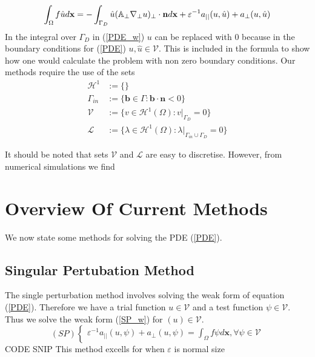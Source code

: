 \documentclass[12pt]{ociamthesis}
\begin{document}
\begin{equation} \label{PDE_w}
\int_{\Omega}f\hat{u}d\mathbf{x} = -\int_{\Gamma_D}\hat{u}(\mathbb{A}_{\perp}\nabla_{\perp} u)_{\perp}\cdot \mathbf{n} d \mathbf{x} + 
\varepsilon^{-1} a_{||}(u,\hat{u})+a_{\perp}(u, \hat{u})\\
\end{equation}
In the integral over $\Gamma_D$ in (\ref{PDE_w}) $u$ can be replaced with $0$ because in the boundary conditions for (\ref{PDE}) $u,\hat{u} \in \mathcal{V}$. This is included in the formula to show how one would calculate the problem with non zero boundary conditions.
Our methods require the use of the sets 
\begin{align}
\mathcal{H}^1 &:= \{\} \\
\Gamma_{in} &:= \{\mathbf{b} \in \Gamma : \mathbf{b} \cdot \mathbf{n} < 0\} \\
\mathcal{V} &:= \{v \in \mathcal{H}^1(\Omega) : v|_{\Gamma_{D}} = 0\} \\
\mathcal{L} &:= \{\lambda \in \mathcal{H}^1(\Omega) : \lambda |_{\Gamma_{in}\cup \Gamma_{D}} = 0\}
\end{align}

It should be noted that sets $\mathcal{V}$ and $\mathcal{L}$ are easy to discretise. However, from numerical simulations we find 

\section{Overview Of Current Methods}
 We now state some methods for solving the PDE (\ref{PDE}).
\subsection{Singular Pertubation Method} \label{SP}
The single perturbation method involves solving the weak form of equation (\ref{PDE}). Therefore we have a trial function $u \in \mathcal{V}$ and a test function $\psi \in \mathcal{V}$. Thus we solve the weak form (\ref{SP_w}) for $(u) \in \mathcal{V}$.
\begin{equation} \label{SP_w}
(SP)
\begin{cases}
\varepsilon^{-1}a_{||}(u, \psi) + a_{\perp}(u, \psi) = \int_{\Omega} f \psi d\mathbf{x}, \forall \psi \in \mathcal{V}
\end{cases}
\end{equation}
CODE SNIP
This method excells for when $\varepsilon$ is normal size
\end{document}
